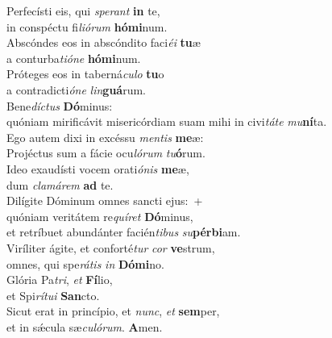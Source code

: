 \evenverse Perfecísti eis, qui \textit{spe}\textit{rant} \textbf{in} te,~\*\\
\evenverse in conspéctu fi\textit{li}\textit{ó}\textit{rum} \textbf{hó}\textbf{mi}num.\\
\oddverse Abscóndes eos in abscóndito faci\textit{é}\textit{i} \textbf{tu}æ~\*\\
\oddverse a conturba\textit{ti}\textit{ó}\textit{ne} \textbf{hó}\textbf{mi}num.\\
\evenverse Próteges eos in taberná\textit{cu}\textit{lo} \textbf{tu}o~\*\\
\evenverse a contradicti\textit{ó}\textit{ne} \textit{lin}\textbf{guá}rum.\\
\oddverse Bene\textit{dí}\textit{ctus} \textbf{Dó}minus:~\*\\
\oddverse quóniam mirificávit misericórdiam suam mihi in civi\textit{tá}\textit{te} \textit{mu}\textbf{ní}ta.\\
\evenverse Ego autem dixi in excéssu \textit{men}\textit{tis} \textbf{me}æ:~\*\\
\evenverse Projéctus sum a fácie ocu\textit{ló}\textit{rum} \textit{tu}\textbf{ó}rum.\\
\oddverse Ideo exaudísti vocem orati\textit{ó}\textit{nis} \textbf{me}æ,~\*\\
\oddverse dum \textit{cla}\textit{má}\textit{rem} \textbf{ad} te.\\
\evenverse Dilígite Dóminum omnes sancti ejus:~+\\
\evenverse  quóniam veritátem re\textit{quí}\textit{ret} \textbf{Dó}minus,~\*\\
\evenverse et retríbuet abundánter facién\textit{ti}\textit{bus} \textit{su}\textbf{pér}\textbf{bi}am.\\
\oddverse Viríliter ágite, et conforté\textit{tur} \textit{cor} \textbf{ve}strum,~\*\\
\oddverse omnes, qui spe\textit{rá}\textit{tis} \textit{in} \textbf{Dó}\textbf{mi}no.\\
\evenverse Glória Pa\textit{tri}, \textit{et} \textbf{Fí}lio,~\*\\
\evenverse et Spi\textit{rí}\textit{tu}\textit{i} \textbf{San}cto.\\
\oddverse Sicut erat in princípio, et \textit{nunc}, \textit{et} \textbf{sem}per,~\*\\
\oddverse et in sǽcula sæ\textit{cu}\textit{ló}\textit{rum}. \textbf{A}men.\\
